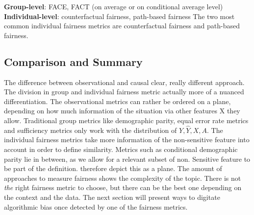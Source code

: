 \textbf{Group-level}: FACE, FACT (on average or on conditional average level) \parencite{Zafar2017PPNFC}\\
\textbf{Individual-level}: counterfactual fairness, path-based fairness \parencite{kusner} 
The two most common individual fairness metrics are counterfactual fairness and path-based fairness.


\subsection{Comparison and Summary}

The difference between observational and causal clear, really different approach. The division in group and individual fairness metric actually more of a nuanced differentiation. The observational metrics can rather be ordered on a plane, depending on how much information of the situation via other features X they allow.
Traditional group metrics like demographic parity, equal error rate metrics and sufficiency metrics only work with the distribution of $Y, \hat{Y}, X, A$. The individual fairness metrics take more information of the non-sensitive feature into account in order to define similarity. Metrics such as conditional demographic parity lie in between, as we allow for a relevant subset of non. Sensitive feature to be part of the definition.
\cite{castelnovo2022} therefore depict this as a plane.
The amount of approaches to measure fairness shows the complexity of the topic. There is not \textit{the} right fairness metric to choose, but there can be the best one depending on the context and the data. The next section will present ways to digitate algorithmic bias once detected by one of the fairness metrics.


